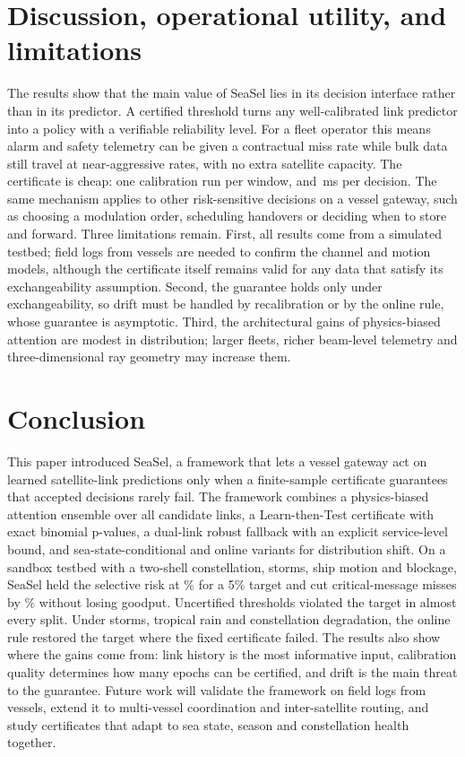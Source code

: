 \section{Discussion, operational utility, and limitations}\label{sec:discussion}
The results show that the main value of SeaSel lies in its decision interface rather than in its predictor. A certified threshold turns any well-calibrated link predictor into a policy with a verifiable reliability level. For a fleet operator this means alarm and safety telemetry can be given a contractual miss rate while bulk data still travel at near-aggressive rates, with no extra satellite capacity. The certificate is cheap: one calibration run per window, and \RMsDec{}\,ms per decision. The same mechanism applies to other risk-sensitive decisions on a vessel gateway, such as choosing a modulation order, scheduling handovers or deciding when to store and forward. Three limitations remain. First, all results come from a simulated testbed; field logs from vessels are needed to confirm the channel and motion models, although the certificate itself remains valid for any data that satisfy its exchangeability assumption. Second, the guarantee holds only under exchangeability, so drift must be handled by recalibration or by the online rule, whose guarantee is asymptotic. Third, the architectural gains of physics-biased attention are modest in distribution; larger fleets, richer beam-level telemetry and three-dimensional ray geometry may increase them.

\section{Conclusion}\label{sec:conclusion}
This paper introduced SeaSel, a framework that lets a vessel gateway act on learned satellite-link predictions only when a finite-sample certificate guarantees that accepted decisions rarely fail. The framework combines a physics-biased attention ensemble over all candidate links, a Learn-then-Test certificate with exact binomial p-values, a dual-link robust fallback with an explicit service-level bound, and sea-state-conditional and online variants for distribution shift. On a sandbox testbed with a two-shell constellation, storms, ship motion and blockage, SeaSel held the selective risk at \RSRisk\% for a 5\% target and cut critical-message misses by \RMissRed\% without losing goodput. Uncertified thresholds violated the target in almost every split. Under storms, tropical rain and constellation degradation, the online rule restored the target where the fixed certificate failed. The results also show where the gains come from: link history is the most informative input, calibration quality determines how many epochs can be certified, and drift is the main threat to the guarantee. Future work will validate the framework on field logs from vessels, extend it to multi-vessel coordination and inter-satellite routing, and study certificates that adapt to sea state, season and constellation health together.
